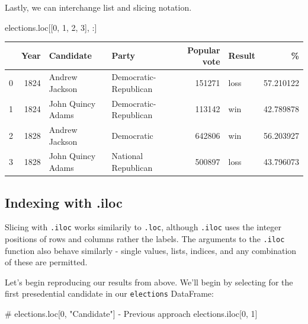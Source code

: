 \documentclass[
  letterpaper,
  DIV=11,
  numbers=noendperiod]{scrreprt}
\newenvironment{Shaded}{\begin{snugshade}}{\end{snugshade}}
\newcommand{\CommentTok}[1]{\textcolor[rgb]{0.37,0.37,0.37}{#1}}
\newcommand{\DecValTok}[1]{\textcolor[rgb]{0.68,0.00,0.00}{#1}}
\newcommand{\NormalTok}[1]{\textcolor[rgb]{0.00,0.23,0.31}{#1}}
\begin{document}
Lastly, we can interchange list and slicing notation.

\begin{Shaded}
\begin{Highlighting}[]
\NormalTok{elections.loc[[}\DecValTok{0}\NormalTok{, }\DecValTok{1}\NormalTok{, }\DecValTok{2}\NormalTok{, }\DecValTok{3}\NormalTok{], :]}
\end{Highlighting}
\end{Shaded}

\begin{tabular}{lrllrlr}
\toprule
{} &  Year &          Candidate &                  Party &  Popular vote & Result &          \% \\
\midrule
0 &  1824 &     Andrew Jackson &  Democratic-Republican &        151271 &   loss &  57.210122 \\
1 &  1824 &  John Quincy Adams &  Democratic-Republican &        113142 &    win &  42.789878 \\
2 &  1828 &     Andrew Jackson &             Democratic &        642806 &    win &  56.203927 \\
3 &  1828 &  John Quincy Adams &    National Republican &        500897 &   loss &  43.796073 \\
\bottomrule
\end{tabular}

\hypertarget{indexing-with-.iloc}{%
\subsection{Indexing with .iloc}\label{indexing-with-.iloc}}

Slicing with \texttt{.iloc} works similarily to \texttt{.loc}, although
\texttt{.iloc} uses the integer positions of rows and columns rather the
labels. The arguments to the \texttt{.iloc} function also behave
similarly - single values, lists, indices, and any combination of these
are permitted.

Let's begin reproducing our results from above. We'll begin by selecting
for the first presedential candidate in our \texttt{elections}
DataFrame:

\begin{Shaded}
\begin{Highlighting}[]
\CommentTok{\# elections.loc[0, "Candidate"] {-} Previous approach}
\NormalTok{elections.iloc[}\DecValTok{0}\NormalTok{, }\DecValTok{1}\NormalTok{]}
\end{Highlighting}
\end{Shaded}
\end{document}

